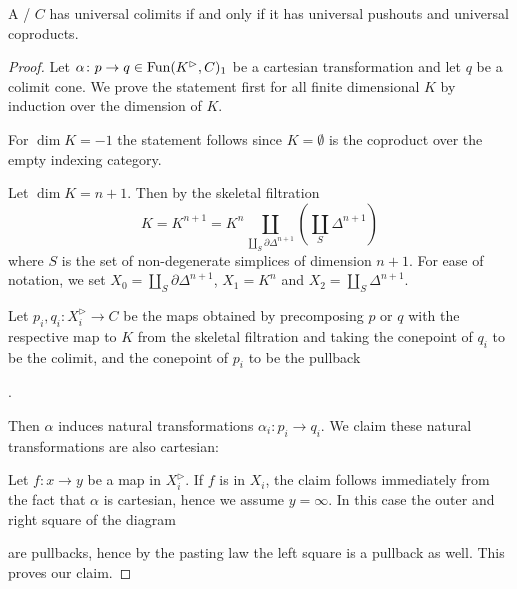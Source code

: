\begin{lemma}\label{lem:univColimIffUnivPoAndCoprod}
    A \inftycat/ $C$ has universal colimits if and only if it has universal pushouts and universal coproducts.
    \begin{proof}
        Let $\alpha\colon p\to q\in\operatorname{Fun}(K^{\rhd},C)_1$ be a cartesian transformation and let $q$ be a colimit cone. 
        We prove the statement first for all finite dimensional $K$ by induction over the dimension of $K$.

        For $\dim K=-1$ the statement follows since $K=\emptyset$ is the coproduct over the empty indexing category.
        
        Let $\dim K=n+1$. 
        Then by the skeletal filtration
        \begin{equation*}
            K=K^{n+1}=K^n\coprod\limits_{\coprod\limits_S \partial\Delta^{n+1}}\left(\coprod_S \Delta^{n+1}\right)
        \end{equation*}
        where $S$ is the set of non-degenerate simplices of dimension $n+1$.
        For ease of notation, we set $X_{0}=\coprod\limits_S \partial\Delta^{n+1}$, $X_1=K^n$ and $X_2=\coprod\limits_S \Delta^{n+1}$.

        Let $p_i,q_i\colon X_i^{\rhd}\to C$ be the maps obtained by precomposing $p$ or $q$ with the respective map to $K$ from the skeletal filtration and taking the conepoint of $q_i$ to be the colimit, and the conepoint of $p_i$ to be the pullback 
        \begin{center}
            \;.
        \end{center}
        Then $\alpha$ induces natural transformations $\alpha_i\colon p_i\to q_i$.
        We claim these natural transformations are also cartesian:

        Let $f\colon x\to y$ be a map in $X_i^{\rhd}$. 
        If $f$ is in $X_i$, the claim follows immediately from the fact that $\alpha$ is cartesian, hence we assume $y=\infty$.
        In this case the outer and right square of the diagram
        \begin{center}
        \end{center}
        are pullbacks, hence by the pasting law the left square is a pullback as well.
        This proves our claim.


\end{proof}
\end{lemma}
